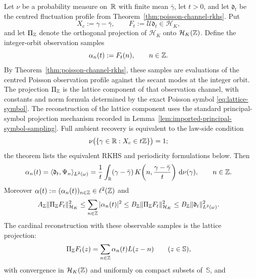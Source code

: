 \begin{theorem}%
\label{thm:poisson-observation-lattice-sampling}
\label{prop:poisson-law-lattice-periodicity}
Let $\nu$ be a probability measure on~$\mathbb{R}$ with finite mean
$\bar{\gamma}$, let $t>0$, and let $\mathfrak d_t$ be the centred
fluctuation profile from Theorem~\ref{thm:poisson-channel-rkhs}.  Put
\[
  X_c:=\gamma-\bar{\gamma},
  \qquad
F_t:=\mathcal U\mathfrak d_t\in\mathcal H_K,
\]
and let $\Pi_{\mathbb{Z}}$ denote the orthogonal projection of $\mathcal H_K$ onto
$\mathcal H_K(\mathbb{Z})$.  Define the integer-orbit observation samples
\[
\alpha_n(t):=F_t(n),\qquad n\in\mathbb{Z} .
\]
By Theorem~\ref{thm:poisson-channel-rkhs}, these samples are evaluations of
the centred Poisson observation profile against the secant modes at the
integer orbit.  The projection $\Pi_{\mathbb{Z}}$ is the lattice component of that
observation channel, with constants and norm formula determined by the exact
Poisson symbol \eqref{eq:lattice-symbol}.  The reconstruction of the lattice
component uses the standard principal-symbol projection mechanism recorded in
Lemma~\ref{lem:imported-principal-symbol-sampling}.  Full ambient recovery is
equivalent to the law-side condition
\[
\nu\bigl(\{\gamma\in\mathbb{R}:X_c\in t\mathbb{Z}\}\bigr)=1;
\]
the theorem lists the equivalent RKHS and periodicity formulations below.
Then
\begin{equation}\label{eq:poisson-observation-integer-samples}
\alpha_n(t)
=\langle \mathfrak d_t,\Psi_n\rangle_{L^2(\omega)}
=\frac1t\int_{\mathbb{R}}
(\gamma-\bar{\gamma})\,
K\!\left(n,\frac{\gamma-\bar{\gamma}}{t}\right)\,\mathrm{d}\nu(\gamma),
\qquad n\in\mathbb{Z} .
\end{equation}
Moreover $\alpha(t):=(\alpha_n(t))_{n\in\mathbb{Z}}\in\ell^2(\mathbb{Z})$ and
\begin{equation}\label{eq:poisson-observation-lattice-stability}
A_{\mathbb{Z}}\|\Pi_{\mathbb{Z}}F_t\|_{\mathcal H_K}^2
\le
\sum_{n\in\mathbb{Z}}|\alpha_n(t)|^2
\le
B_{\mathbb{Z}}\|\Pi_{\mathbb{Z}}F_t\|_{\mathcal H_K}^2
\le
B_{\mathbb{Z}}\|\mathfrak d_t\|_{L^2(\omega)}^2.
\end{equation}
The cardinal reconstruction with these observable samples is the lattice
projection:
\begin{equation}\label{eq:poisson-observation-cardinal-projection}
\Pi_{\mathbb{Z}}F_t(z)
=\sum_{n\in\mathbb{Z}}\alpha_n(t)L(z-n)
\qquad(z\in\mathbb S),
\end{equation}
with convergence in $\mathcal H_K(\mathbb{Z})$ and uniformly on compact subsets
of~$\mathbb S$, and
\begin{equation}\label{eq:poisson-observation-cardinal-norm}

\end{equation}
\end{theorem}
